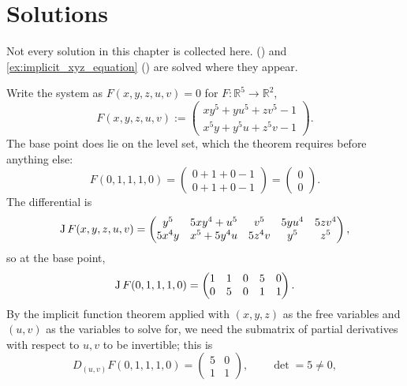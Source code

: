 
\section{Solutions}
\label{sec:imft_solutions}

Not every solution in this chapter is collected here. 
() and \cref{ex:implicit_xyz_equation}
() are solved where they appear.

\begin{exercisesolution}
\label{sol:implicit_system_5var}
Write the system as $F(x,y,z,u,v) = 0$ for $F : \mathbb{R}^5 \to \mathbb{R}^2$,
\[F(x,y,z,u,v) := \begin{pmatrix} xy^5+yu^5+zv^5-1 \\ x^5y+y^5u+z^5v-1 \end{pmatrix}.\]
The base point does lie on the level set, which the theorem requires before anything else:
\[F(0,1,1,1,0) = \begin{pmatrix} 0 + 1 + 0 - 1 \\ 0 + 1 + 0 - 1\end{pmatrix}
  = \begin{pmatrix} 0 \\ 0\end{pmatrix}.\]
The differential is
\[\operatorname{J} F(x,y,z,u,v) = \begin{pmatrix} y^5 & 5xy^4+u^5 & v^5 & 5yu^4 & 5zv^4 \\ 5x^4y & x^5+5y^4u & 5z^4v & y^5 & z^5 \end{pmatrix},\]
so at the base point,
\[\operatorname{J} F(0,1,1,1,0) = \begin{pmatrix} 1 & 1 & 0 & 5 & 0 \\ 0 & 5 & 0 & 1 & 1 \end{pmatrix}.\]
By the implicit function theorem applied with $(x,y,z)$ as the free variables and $(u,v)$ as the
variables to solve for, we need the submatrix of partial derivatives with respect to $u,v$ to be
invertible; this is
\[D_{(u,v)}F(0,1,1,1,0) = \begin{pmatrix} 5 & 0 \\ 1 & 1\end{pmatrix}, \qquad \det = 5 \neq 0,\]

\end{exercisesolution}
